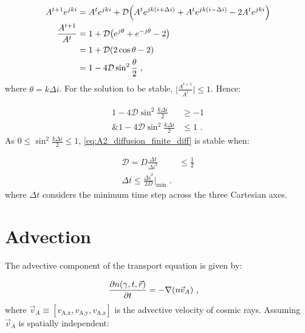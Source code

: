\begin{equation}
    \begin{aligned}
    A^{t+1}e^{jki}&=A^te^{jki}+\mathcal{D}\qty(A^{t}e^{jk\qty(i+\Delta i)}+A^{t}e^{jk\qty(i-\Delta i)}-2A^te^{jki}) \\
    \frac{A^{t+1}}{A^t}&=1+\mathcal{D}\qty(e^{j\theta}+e^{-j\theta}-2) \\
    &=1+\mathcal{D}\qty(2\cos\theta-2) \\
    &=1-4\mathcal{D}\sin^2\frac{\theta}{2}\text{ ,} 
    \end{aligned}
\end{equation}
\noindent where $\theta= k\Delta i$. For the solution to be stable, $\lvert \frac{A^{t+1}}{A^t}\rvert\leq 1$. Hence:

\begin{equation}
    \begin{aligned}
    1-4\mathcal{D}\sin^2\frac{k\Delta i}{2} &\geq -1 \\
    \text{\& } 1-4\mathcal{D}\sin^2\frac{k\Delta i}{2} &\leq 1 \text{ .} 
    \end{aligned} \label{eq:A2_diffusion_finite_stability_cond}
\end{equation}
\noindent As $0\leq \sin^2\frac{k\Delta i}{2}\leq 1$, \autoref{eq:A2_diffusion_finite_diff} is stable when:

\begin{equation}
    \begin{aligned}
    \mathcal{D}=D\frac{\Delta t}{\Delta i^2}&\leq \frac{1}{2} \\
    \Delta t\leq \frac{\Delta i^2}{2D}\bigg|_\text{min}\text{ .} 
    \end{aligned}
\end{equation}
\noindent where $\Delta t$ considers the minimum time step across the three Cartesian axes.

\section{Advection}

The advective component of the transport equation is given by:

\begin{equation}
    \begin{aligned}
        \pdv{n\qty(\gamma,t,\vec{r})}{t}&=-\nabla\qty(n\vec{v}_A)\text{ ,} 
    \end{aligned}
\end{equation}
\noindent where $\vec{v}_A\equiv [v_\text{A,x},v_\text{A,y},v_\text{A,z}]$ is the advective velocity of cosmic rays. Assuming $\vec{v}_A$ is spatially independent:

